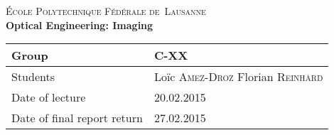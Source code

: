 \begin{titlepage}
\begin{center}
    \textsc{\LARGE École Polytechnique Fédérale de~Lausanne}\\[1.5cm] 
    {\huge \bfseries Optical Engineering: Imaging}\\[0.4cm] 
    \begin{tabular}{|p{5cm}|p{4cm}|}
        \hline
        Group & C-XX \\ \hline
        Students & Loïc \textsc{Amez-Droz} \newline Florian \textsc{Reinhard} \\ \hline
        Date of lecture & 20.02.2015 \\ \hline
        Date of final report return & 27.02.2015 \\ \hline
    \end{tabular}
\end{center}


\begin{abstract}
    \lipsum[3]
\end{abstract}
 
\vfill
\end{titlepage}
